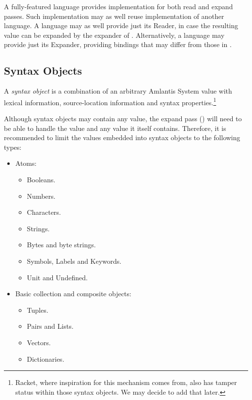 A fully-featured language provides implementation for both read and expand passes. Such implementation may as well reuse implementation of another language. A language may as well provide just its Reader, in case the resulting value can be expanded by the expander of \AmlBase. Alternatively, a language may provide just its Expander, providing bindings that may differ from those in \AmlBase.





\subsection{Syntax Objects}
\label{subsec:environment-language-syntax-objects}

A {\em syntax object} is a combination of an arbitrary Amlantis System value with lexical information, source-location information and syntax properties.\footnote{Racket, where inspiration for this mechanism comes from, also has tamper status within those syntax objects. We may decide to add that later.}

Although syntax objects may contain any value, the expand pass () will need to be able to handle the value and any value it itself contains. Therefore, it is recommended to limit the values embedded into syntax objects to the following types:

\begin{itemize}
  \item Atoms:
  \begin{itemize}
    \item Booleans.
    \item Numbers.
    \item Characters.
    \item Strings.
    \item Bytes and byte strings.
    \item Symbols, Labels and Keywords.
    \item Unit and Undefined.
  \end{itemize}
  \item Basic collection and composite objects:
  \begin{itemize}
    \item Tuples.
    \item Pairs and Lists.
    \item Vectors.
    \item Dictionaries.
  \end{itemize}
\end{itemize}




